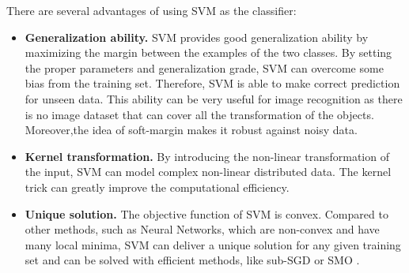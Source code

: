 There are several advantages of using SVM as the classifier: 
\begin{itemize}
	\item \textbf{Generalization ability.} SVM provides good generalization ability by maximizing the margin between the examples of the two classes. By setting the proper parameters and generalization grade, SVM can overcome some bias from the training set. Therefore, SVM is able to make correct prediction for unseen data. This ability can be very useful for image recognition as there is no image dataset that can cover all the transformation of the objects. Moreover,the idea of soft-margin makes it robust against noisy data.
	\item \textbf{Kernel transformation.} By introducing the non-linear transformation of the input, SVM can model complex non-linear distributed data. The kernel trick can greatly improve the computational efficiency.   
	\item \textbf{Unique solution.} The objective function of SVM is  convex. Compared to other methods, such as Neural Networks, which are non-convex and have many local minima, SVM can deliver a unique solution for any given training set and can be solved with efficient methods, like sub-SGD \cite{shalev2011pegasos} or SMO \cite{platt1998sequential}. 
\end{itemize}

